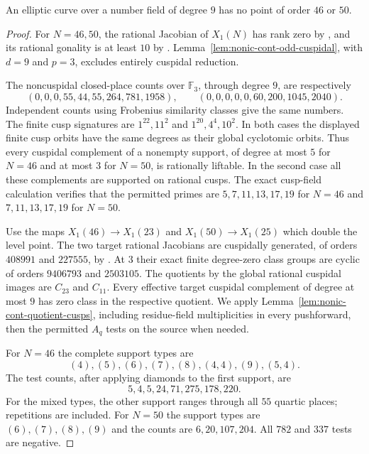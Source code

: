 
\begin{proposition}\label{prop:nonic-no46-50}
An elliptic curve over a number field of degree $9$ has no point of
order $46$ or $50$.
\end{proposition}
\begin{proof}
For $N=46,50$, the rational Jacobian of $X_1(N)$ has rank zero by
\cite[Theorem~3.1(2)]{DEHMZ}, and its rational gonality is at least $10$
by \cite[Table~1]{NV}. Lemma~\ref{lem:nonic-cont-odd-cuspidal}, with
$d=9$ and $p=3$, excludes entirely cuspidal reduction.

The noncuspidal closed-place counts over $\mathbb F_3$, through degree
$9$, are respectively
\[
 (0,0,0,55,44,55,264,781,1958),\qquad
 (0,0,0,0,0,60,200,1045,2040).
\]
Independent counts using Frobenius similarity classes give the same
numbers. The finite cusp signatures are $1^{22},11^2$ and
$1^{20},4^4,10^2$. In both cases the displayed finite cusp orbits have
the same degrees as their global cyclotomic orbits.
Thus every cuspidal complement of a nonempty support, of degree at most
$5$ for $N=46$ and at most $3$ for $N=50$, is rationally liftable.
In the second case all these complements are supported on rational cusps.
The exact cusp-field calculation verifies that the permitted primes are
$5,7,11,13,17,19$ for $N=46$ and $7,11,13,17,19$ for $N=50$.

Use the maps $X_1(46)\to X_1(23)$ and $X_1(50)\to X_1(25)$
which double the level point. The two target rational Jacobians are
cuspidally generated, of orders $408991$ and $227555$, by
\cite[Corollary~4.14 and Table~4]{DEHMZ}.
At $3$ their exact finite degree-zero class groups are cyclic of orders
$9406793$ and $2503105$. The quotients by the global rational cuspidal
images are $C_{23}$ and $C_{11}$. Every effective target cuspidal
complement of degree at most $9$ has zero class in the respective
quotient. We apply Lemma~\ref{lem:nonic-cont-quotient-cusps}, including
residue-field multiplicities in every pushforward, then the permitted
$A_q$ tests on the source when needed.

For $N=46$ the complete support types are
\[
 (4),(5),(6),(7),(8),(4,4),(9),(5,4).
\]
The test counts, after applying diamonds to the first support, are
\[
 5,4,5,24,71,275,178,220.
\]
For the mixed types, the other support ranges through all $55$ quartic
places; repetitions are included. For $N=50$ the support types are
$(6),(7),(8),(9)$ and the counts are $6,20,107,204$.
All $782$ and $337$ tests are negative.


\end{proof}
